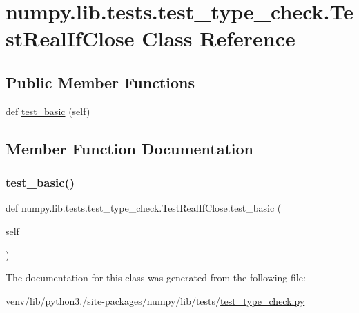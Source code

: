 \hypertarget{classnumpy_1_1lib_1_1tests_1_1test__type__check_1_1TestRealIfClose}{}\section{numpy.\+lib.\+tests.\+test\+\_\+type\+\_\+check.\+Test\+Real\+If\+Close Class Reference}
\label{classnumpy_1_1lib_1_1tests_1_1test__type__check_1_1TestRealIfClose}
\subsection*{Public Member Functions}
\begin{DoxyCompactItemize}
\item 
def \hyperlink{classnumpy_1_1lib_1_1tests_1_1test__type__check_1_1TestRealIfClose_afad12b492194f23a497a2a05f726677b}{test\+\_\+basic} (self)
\end{DoxyCompactItemize}


\subsection{Member Function Documentation}
\mbox{\label{classnumpy_1_1lib_1_1tests_1_1test__type__check_1_1TestRealIfClose_afad12b492194f23a497a2a05f726677b}} 
\subsubsection{\texorpdfstring{test\+\_\+basic()}{test\_basic()}}
{\footnotesize\ttfamily def numpy.\+lib.\+tests.\+test\+\_\+type\+\_\+check.\+Test\+Real\+If\+Close.\+test\+\_\+basic (\begin{DoxyParamCaption}\item[{}]{self }\end{DoxyParamCaption})}



The documentation for this class was generated from the following file\+:\begin{DoxyCompactItemize}
\item 
venv/lib/python3./site-\/packages/numpy/lib/tests/\hyperlink{test__type__check_8py}{test\+\_\+type\+\_\+check.\+py}\end{DoxyCompactItemize}
